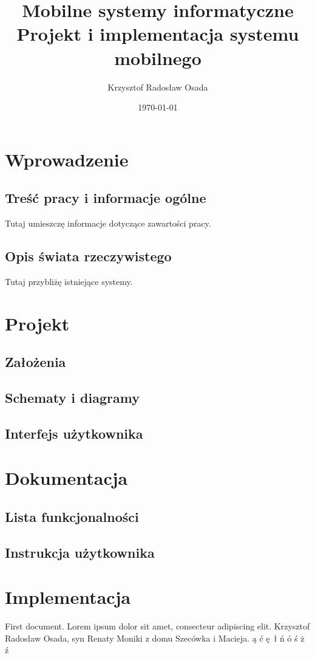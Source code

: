 \documentclass[12pt, a4paper]{article}
\title{Mobilne systemy informatyczne \\\normalsize\textbf{Projekt i implementacja systemu mobilnego}}
\author{Krzysztof Radosław Osada}
\date{\today}
\begin{document}
    \maketitle

    \tableofcontents

    \section{Wprowadzenie}

    \subsection{Treść pracy i informacje ogólne}
    Tutaj umieszczę informacje dotyczące zawartości pracy.

    \subsection{Opis świata rzeczywistego}
    Tutaj przybliżę istniejące systemy.

    \section{Projekt}
    
    \subsection{Założenia}
    \subsection{Schematy i diagramy}
    \subsection{Interfejs użytkownika}

    \section{Dokumentacja}
    \subsection{Lista funkcjonalności}
    \subsection{Instrukcja użytkownika}

    \section{Implementacja}

    First document. Lorem ipsum dolor sit amet, consecteur adipiscing elit.
    Krzysztof Radosław Osada, syn Renaty Moniki z domu Szecówka i Macieja.
    ą ć ę ł ń ó ś ż ź
\end{document}

